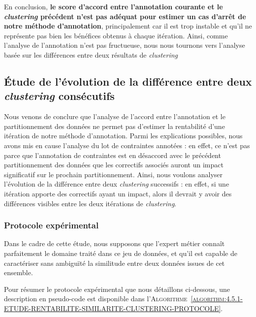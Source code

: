 			En conclusion, \textbf{le score d'accord entre l'annotation courante et le \textit{clustering} précédent n'est pas adéquat pour estimer un cas d'arrêt de notre méthode d'annotation}, principalement car il est trop instable et qu'il ne représente pas bien les bénéfices obtenus à chaque itération.
			Ainsi, comme l'analyse de l'annotation n'est pas fructueuse, nous nous tournons vers l'analyse basée sur les différences entre deux résultats de \textit{clustering}
	
	\subsection{Étude de l'évolution de la différence entre deux \textit{clustering} consécutifs}
	\label{section:4.5.2-ETUDE-RENTABILITE-SIMILARITE-CLUSTERING}
		
		Nous venons de conclure que l'analyse de l'accord entre l'annotation et le partitionnement des données ne permet pas d'estimer la rentabilité d'une itération de notre méthode d'annotation.
		Parmi les explications possibles, nous avons mis en cause l'analyse du lot de contraintes annotées : en effet, ce n'est pas parce que l'annotation de contraintes est en désaccord avec le précédent partitionnement des données que les correctifs associés auront un impact significatif sur le prochain partitionnement.
		Ainsi, nous voulons analyser l'évolution de la différence entre deux \textit{clustering} successifs : en effet, si une itération apporte des correctifs ayant un impact, alors il devrait y avoir des différences visibles entre les deux itérations de \textit{clustering}.
	
		\subsubsection{Protocole expérimental}
			
			\begin{leftBarWarning}
				Dans le cadre de cette étude, nous supposons que l'expert métier connaît parfaitement le domaine traité dans ce jeu de données, et qu'il est capable de caractériser sans ambiguïté la similitude entre deux données issues de cet ensemble.
			\end{leftBarWarning}
			
			Pour résumer le protocole expérimental que nous détaillons ci-dessous, une description en pseudo-code est disponible dans l'\textsc{Algorithme~\ref{algorithm:4.5.1-ETUDE-RENTABILITE-SIMILARITE-CLUSTERING-PROTOCOLE}}.
			
